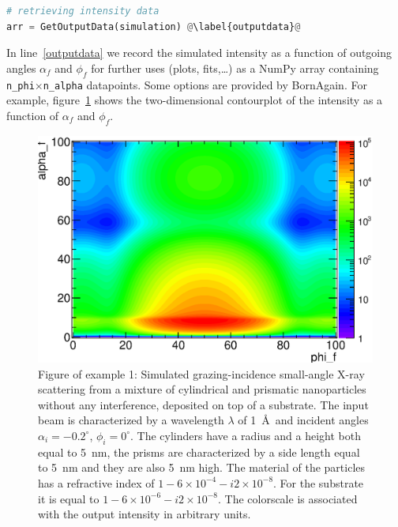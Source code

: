 \begin{lstlisting}[language=python, style=eclipseboxed,name=ex1,nolol]
# retrieving intensity data
arr = GetOutputData(simulation) @\label{outputdata}@
\end{lstlisting}


\noindent In line~\ref{outputdata} we record the simulated intensity
as a function of outgoing angles $\alpha_f$ and $\phi_f$ for further
uses (plots, fits,\ldots) as a NumPy array containing
\texttt{n\_phi}$\times$\texttt{n\_alpha}
datapoints. Some options are provided by BornAgain. For example, figure~\ref{fig:output_ex1} shows the two-dimensional
contourplot of the intensity as a function of $\alpha_f$ and
$\phi_f$. 

\begin{figure}[h]
  \begin{center}
   \includegraphics[clip=true, width=120mm]{Manual_ex1.eps}
  \end{center}
  \caption[Example 1: Simulated grazing-incidence small-angle X-ray scattering from a mixture of
cylindrical and prismatic nanoparticles without any interference, deposited on top
of a substrate]{Figure of example 1: Simulated grazing-incidence small-angle X-ray scattering from a mixture of
cylindrical and prismatic nanoparticles without any interference, deposited on top
of a substrate. The input beam is characterized by a wavelength
$\lambda$ of 1~\AA\ and incident angles $\alpha_i=-0.2^{\circ}$, $\phi_i=0^{\circ}$. The
cylinders have a radius and a height both equal to 5~nm, the prisms
are characterized by a side length equal to 5~nm and they are also 5~nm high. The
material of the particles has a refractive index of $1-6\times 10^{-4}-i2\times 10^{-8}$. For the substrate
it is equal to $1-6\times 10^{-6} -i2\times 10^{-8} $. The colorscale
is associated with the output intensity in arbitrary units. }
\label{fig:output_ex1}
\end{figure}

